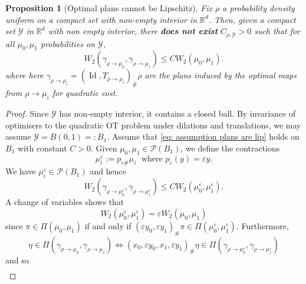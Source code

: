 \documentclass[11pt, oneside, titlepage]{book}
\theoremstyle{plain}
\newtheorem{proposition}[theorem]{Proposition}
\theoremstyle{definition}
\newcommand{\R}{\mathbb{R}}
\newcommand{\Y}{\mathcal{Y}}
\DeclareMathOperator{\id}{Id}
\begin{document}
\begin{proposition}[Optimal plans cannot be Lipschitz]
    Fix $\rho$ a probability density uniform on a compact set with non-empty interior in $\R^d$. Then, given a compact set $\Y$ in $\R^d$ with non empty interior, there \textbf{does not exist} $C_{\rho, \Y} >0$ such that for all $\mu_0, \mu_1$ probabilities on $\Y$,
    \begin{equation}
    \label{eq: assumption plans are lip}
        W_2(\gamma_{\rho \to \mu_0}, \gamma_{\rho \to \mu_1}) \leq C W_2(\mu_0, \mu_1).
    \end{equation}
    where here $\gamma_{\rho \to \mu_i} = (\id, T_{\rho \to \mu_i})_\#\rho$ are the plans induced by the optimal maps from $\rho \to \mu_i$ for quadratic cost.
\end{proposition}
\begin{proof}
    Since $\Y$ has non-empty interior, it contains a closed ball. By invariance of optimisers to the quadratic OT problem under dilations and translations, we may assume $\Y = \overline{B}(0, 1) =: B_1$. Assume that \eqref{eq: assumption plans are lip} holds on $B_1$ with constant $C> 0$. Given $\mu_0, \mu_1 \in \mathcal{P}(B_1)$, we define the contractions
    \begin{equation*}
        \mu_i^\varepsilon := p_{\varepsilon\#} \mu_i \; \text{ where } p_\varepsilon(y) = \varepsilon y.
    \end{equation*}
    We have $\mu_i^\varepsilon \in \mathcal{P}(B_1)$ and hence
    \begin{equation}
    \label{eq: lip for the rho eps plans}
        W_2(\gamma_{\rho \to \mu_0^\varepsilon}, \gamma_{\rho \to \mu_1^\varepsilon}) \leq C W_2(\mu_0^\varepsilon, \mu_1^\varepsilon).
    \end{equation}
    A change of variables shows that
    \begin{equation*}
        W_2(\mu_0^\varepsilon, \mu_1^\varepsilon) = \varepsilon W_2(\mu_0, \mu_1)
    \end{equation*}
    since $\pi \in \Pi(\mu_0, \mu_1)$ if and only if $(\varepsilon y_0, \varepsilon y_1)_\#\pi \in \Pi(\mu_0^\varepsilon, \mu_1^\varepsilon)$.
    Furthermore,
    \begin{equation*}
        \eta \in \Pi(\gamma_{\rho \to \mu_0}, \gamma_{\rho \to \mu_1}) \iff (x_0, \varepsilon y_0, x_1, \varepsilon y_1)_\#\eta \in \Pi(\gamma_{\rho \to \mu_0^\varepsilon}, \gamma_{\rho \to \mu_1^\varepsilon})
    \end{equation*}
    and so
    \begin{align*}

\end{align*}
\end{proof}
\end{document}
